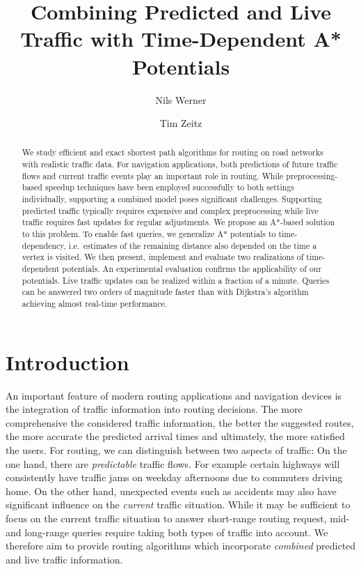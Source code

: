 \documentclass[a4paper,UKenglish,cleveref, autoref, thm-restate,anonymous]{lipics-v2021}
\title{Combining Predicted and Live Traffic with Time-Dependent A* Potentials}
\author{Nils Werner}{Karlsruhe Institute of Technology, Germany}{}{}{}
\author{Tim Zeitz}{Karlsruhe Institute of Technology, Germany}{tim.zeitz@kit.edu}{https://orcid.org/0000-0003-4746-3582}{}
\begin{document}
\maketitle

\begin{abstract}
We study efficient and exact shortest path algorithms for routing on road networks with realistic traffic data.
For navigation applications, both predictions of future traffic flows and current traffic events play an important role in routing.
While preprocessing-based speedup techniques have been employed successfully to both settings individually, supporting a combined model poses significant challenges.
Supporting predicted traffic typically requires expensive and complex preprocessing while live traffic requires fast updates for regular adjustments.
We propose an A*-based solution to this problem.
To enable fast queries, we generalize A* potentials to time-dependency, i.e.\ estimates of the remaining distance also depended on the time a vertex is visited.
We then present, implement and evaluate two realizations of time-dependent potentials.
An experimental evaluation confirms the applicability of our potentials.
Live traffic updates can be realized within a fraction of a minute.
Queries can be answered two orders of magnitude faster than with Dijkstra's algorithm achieving almost real-time performance.
\end{abstract}

\section{Introduction}

An important feature of modern routing applications and navigation devices is the integration of traffic information into routing decisions.
The more comprehensive the considered traffic information, the better the suggested routes, the more accurate the predicted arrival times and ultimately, the more satisfied the users.
For routing, we can distinguish between two aspects of traffic:
On the one hand, there are \emph{predictable} traffic flows.
For example certain highways will consistently have traffic jams on weekday afternoons due to commuters driving home.
On the other hand, unexpected events such as accidents may also have significant influence on the \emph{current} traffic situation.
While it may be sufficient to focus on the current traffic situation to answer short-range routing request, mid- and long-range queries require taking both types of traffic into account.
We therefore aim to provide routing algorithms which incorporate \emph{combined} predicted and live traffic information.
\end{document}
